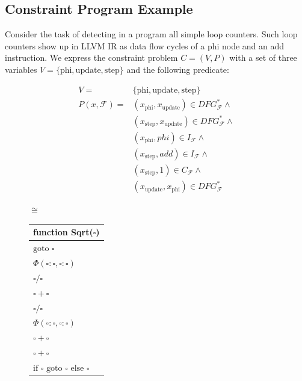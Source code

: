 \subsection{Constraint Program Example}

    Consider the task of detecting in a program all simple loop counters.
    Such loop counters show up in LLVM IR as data flow cycles of a phi node
    and an add instruction.
    We express the constraint problem $C=(V,P)$ with a set of three variables
    $V=\{\text{phi}, \text{update}, \text{step}\}$ and the following predicate:

\begin{figure}
\begin{minipage}{0.4\textwidth}
    \begin{align*}
        V=&\{\text{phi}, \text{update}, \text{step}\}\\
        P(x,\mathcal F)=&(x_\text{phi},x_\text{update})\in DFG_\mathcal{F}^*\land\\
                        &(x_\text{step},x_\text{update})\in DFG_\mathcal{F}^*\land\\
                        &(x_\text{phi}, phi)\in I_\mathcal{F}\land\\
                        &(x_\text{step}, add)\in I_\mathcal{F}\land\\
                        &(x_\text{step},1)\in C_\mathcal{F}\land\\
                        &(x_\text{update},x_\text{phi})\in DFG_\mathcal{F}^*
    \end{align*}
\end{minipage}
\begin{minipage}{0.04\textwidth}
\centering
$\cong$
\end{minipage}
\begin{minipage}{0.22\textwidth}
\begin{tabular}{|l|}
\multicolumn{1}{c}{{\bf function} Sqrt($\square$)}\\
\hline
$\text{goto } \square$\\
$\Phi(\square:\square,\square:\square)$\\
$\square/\square$\\
$\square+\square$\\
$\square/\square$\\
$\Phi(\square:\square,\square:\square)$\\
$\square+\square$\\
$\square+\square$\\
$\text{if }\square\text{ goto }\square\text{ else }\square$\\

\end{tabular}
\end{minipage}
\end{figure}

